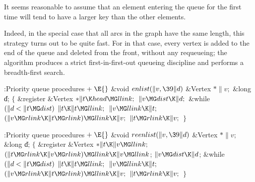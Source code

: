 It seems reasonable to assume that an element entering the queue for the
first time will tend to have a larger key than the other elements.

Indeed, in the special case that all arcs in the graph have the same
length, this strategy turns out to be quite fast. For in that case,
every vertex is added to the end of the queue and deleted from the
front, without any requeueing; the algorithm produces a strict
first-in-first-out queueing discipline and performs a breadth-first search.

\Y\B\4:Priority queue procedures\X${}\mathrel+\E{}$\6
\1\1\&{void} ${}\\{enlist}(\|v,\39\|d){}$\6
\&{Vertex} ${}{*}\|v;{}$\6
\&{long} \|d;\2\2\6
${}\{{}$\5
\1\&{register} \&{Vertex} ${}{*}\|t\K\\{head}\MG\\{llink};{}$\7
${}\|v\MG\\{dist}\K\|d;{}$\6
\&{while} ${}(\|d<\|t\MG\\{dist}){}$\1\5
${}\|t\K\|t\MG\\{llink};{}$\2\6
${}\|v\MG\\{llink}\K\|t;{}$\6
${}(\|v\MG\\{rlink}\K\|t\MG\\{rlink})\MG\\{llink}\K\|v;{}$\6
${}\|t\MG\\{rlink}\K\|v;{}$\6
\4${}\}{}$\2\par
\fi

\B{}:Priority queue procedures\X${}\mathrel+\E{}$\6
\1\1\&{void} ${}\\{reenlist}(\|v,\39\|d){}$\6
\&{Vertex} ${}{*}\|v;{}$\6
\&{long} \|d;\2\2\6
${}\{{}$\5
\1\&{register} \&{Vertex} ${}{*}\|t\K\|v\MG\\{llink};{}$\7
${}(\|t\MG\\{rlink}\K\|v\MG\\{rlink})\MG\\{llink}\K\|v\MG\\{llink}{}$;\6
${}\|v\MG\\{dist}\K\|d{}$;\6
\&{while} ${}(\|d<\|t\MG\\{dist}){}$\1\5
${}\|t\K\|t\MG\\{llink};{}$\2\6
${}\|v\MG\\{llink}\K\|t;{}$\6
${}(\|v\MG\\{rlink}\K\|t\MG\\{rlink})\MG\\{llink}\K\|v;{}$\6
${}\|t\MG\\{rlink}\K\|v;{}$\6
\4${}\}{}$\2\par
\fi

